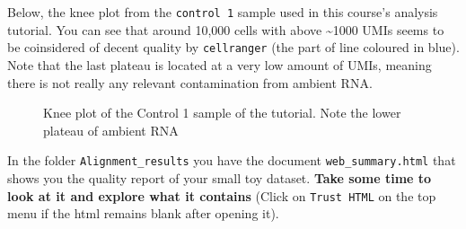\documentclass[
  letterpaper,
  DIV=11,
  numbers=noendperiod]{scrartcl}
\begin{document}
Below, the knee plot from the \texttt{control\ 1} sample used in this
course's analysis tutorial. You can see that around 10,000 cells with
above \textasciitilde1000 UMIs seems to be coinsidered of decent quality
by \texttt{cellranger} (the part of line coloured in blue). Note that
the last plateau is located at a very low amount of UMIs, meaning there
is not really any relevant contamination from ambient RNA.

\begin{figure}


\caption{\label{fig-knee}Knee plot of the Control 1 sample of the
tutorial. Note the lower plateau of ambient RNA}

\end{figure}%

\begin{tcolorbox}[enhanced jigsaw, bottomrule=.15mm, arc=.35mm, coltitle=black, colback=white, opacityback=0, colframe=quarto-callout-note-color-frame, toptitle=1mm, opacitybacktitle=0.6, breakable, colbacktitle=quarto-callout-note-color!10!white, toprule=.15mm, bottomtitle=1mm, left=2mm, titlerule=0mm, title={Exercise}, leftrule=.75mm, rightrule=.15mm]

In the folder \texttt{Alignment\_results} you have the document
\texttt{web\_summary.html} that shows you the quality report of your
small toy dataset. \textbf{Take some time to look at it and explore what
it contains} (Click on \texttt{Trust\ HTML} on the top menu if the html
remains blank after opening it).

\end{tcolorbox}
\end{document}
